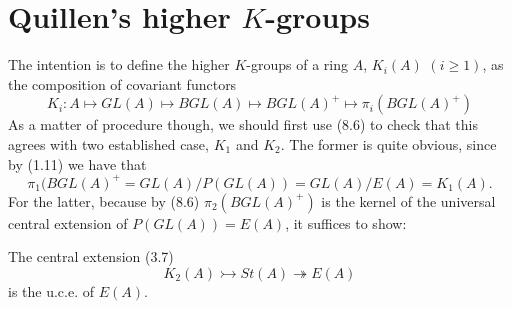 \chapter{Quillen's higher $K$-groups} %
\label{cha:9quillen_s_higher_k_groups}

The intention is to define the higher $K$-groups of a ring $A$, $K_i(A)$ $(i\geqslant 1)$, as the composition of covariant functors
\[K_i\colon   A\mapsto GL(A) \mapsto BGL(A) \mapsto BGL(A)^+\mapsto \pi_i(BGL(A)^+)\]
As a matter of procedure though, we should first use (8.6) to check that this agrees with two established case, $K_1$ and $K_2$. The former is quite obvious, since by (1.11) we have that
\[\pi_1(BGL(A)^+=GL(A)/P(GL(A))=GL(A)/E(A)=K_1(A).\]
For the latter, because by (8.6) $\pi_2(BGL(A)^+)$ is the kernel of the universal central extension of $P(GL(A))=E(A)$, it suffices to show:
\begin{theorem}
The central extension (3.7)
\[K_2(A)\rightarrowtail St(A)\twoheadrightarrow E(A)\]
is the u.c.e. of $E(A)$.
\end{theorem}

